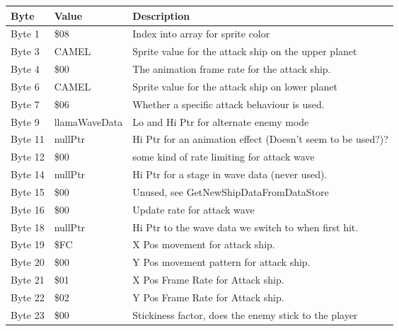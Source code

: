 \begin{figure}[H]
{\begin{adjustbox}{width=12cm}
\begin{tabular}{lll}
\toprule
 Byte    & Value              & Description                                                        \\
\midrule
 Byte 1  & \$08                & Index into array for sprite color                                  \\
 Byte 3  & CAMEL              & Sprite value for the attack ship on the upper planet               \\
 Byte 4  & \$00                & The animation frame rate for the attack ship.                      \\
 Byte 6  & CAMEL              & Sprite value for the attack ship on lower planet                   \\
 Byte 7  & \$06                & Whether a specific attack behaviour is used.                       \\
 Byte 9  & llamaWaveData      & Lo and Hi Ptr for alternate enemy mode                             \\
 Byte 11 & nullPtr            & Hi Ptr for an animation effect (Doesn't seem to be used?)?         \\
 Byte 12 & \$00                & some kind of rate limiting for attack wave                         \\
 Byte 14 & nullPtr            & Hi Ptr for a stage in wave data (never used).                      \\
 Byte 15 & \$00                & Unused, see GetNewShipDataFromDataStore                            \\
 Byte 16 & \$00                & Update rate for attack wave                                        \\
 Byte 18 & nullPtr            & Hi Ptr to the wave data we switch to when first hit.               \\
 Byte 19 & \$FC                & X Pos movement for attack ship.                                    \\
 Byte 20 & \$00                & Y Pos movement pattern for attack ship.                            \\
 Byte 21 & \$01                & X Pos Frame Rate for Attack ship.                                  \\
 Byte 22 & \$02                & Y Pos Frame Rate for Attack ship.                                  \\
 Byte 23 & \$00                & Stickiness factor, does the enemy stick to the player              \\

\end{tabular}
\end{adjustbox}}
\end{figure}

